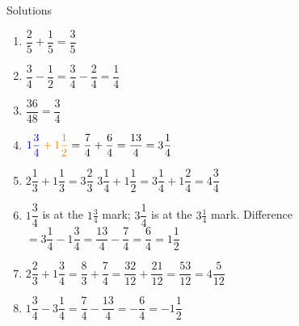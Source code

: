 \documentclass{beamer}
\begin{document}
\begin{frame}{ Solutions}
\vspace{-1em}
\small
\begin{enumerate}
  \item $\dfrac{2}{5} + \dfrac{1}{5} = \dfrac{3}{5}$
  \hfill
  \item $\dfrac{3}{4} - \dfrac{1}{2} = \dfrac{3}{4} - \dfrac{2}{4} = \dfrac{1}{4}$
  \hfill
  \item $\dfrac{36}{48} = \dfrac{3}{4}$

  \item $\color{blue}1\dfrac{3}{4} \color{orange}+ 1\dfrac{1}{2} \color{black}= \dfrac{7}{4} + \dfrac{6}{4} = \dfrac{13}{4} = 3\dfrac{1}{4}$

  \item $2\dfrac{1}{3} + 1\dfrac{1}{3} = 3\dfrac{2}{3}$
  \hfill
  $3\dfrac{1}{4} + 1\dfrac{1}{2} = 3\dfrac{1}{4} + 1\dfrac{2}{4} = 4\dfrac{3}{4}$

  \item $1\dfrac{3}{4}$ is at the $1\tfrac{3}{4}$ mark; $3\dfrac{1}{4}$ is at the $3\tfrac{1}{4}$ mark.
  Difference $= 3\dfrac{1}{4} - 1\dfrac{3}{4} = \dfrac{13}{4} - \dfrac{7}{4} = \dfrac{6}{4} = 1\dfrac{1}{2}$

  \item $2\dfrac{2}{3} + 1\dfrac{3}{4} = \dfrac{8}{3} + \dfrac{7}{4} = \dfrac{32}{12} + \dfrac{21}{12} = \dfrac{53}{12} = 4\dfrac{5}{12}$

  \item $1\dfrac{3}{4} - 3\dfrac{1}{4} = \dfrac{7}{4} - \dfrac{13}{4} = -\dfrac{6}{4} = -1\dfrac{1}{2}$
\end{enumerate}
\end{frame}
\end{document}
